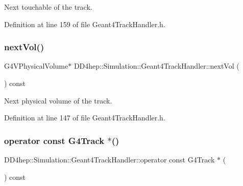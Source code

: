 Next touchable of the track. 



Definition at line 159 of file Geant4\+Track\+Handler.\+h.

\hypertarget{class_d_d4hep_1_1_simulation_1_1_geant4_track_handler_ad00d99a8dbf18835de9b4cc52a50061b}{}\label{class_d_d4hep_1_1_simulation_1_1_geant4_track_handler_ad00d99a8dbf18835de9b4cc52a50061b} 
\subsubsection{\texorpdfstring{next\+Vol()}{nextVol()}}
{\footnotesize\ttfamily G4\+V\+Physical\+Volume$\ast$ D\+D4hep\+::\+Simulation\+::\+Geant4\+Track\+Handler\+::next\+Vol (\begin{DoxyParamCaption}{ }\end{DoxyParamCaption}) const\hspace{0.3cm}{\ttfamily [inline]}}



Next physical volume of the track. 



Definition at line 147 of file Geant4\+Track\+Handler.\+h.

\hypertarget{class_d_d4hep_1_1_simulation_1_1_geant4_track_handler_a6a8487e74ce467e4792ec60cf9846f9e}{}\label{class_d_d4hep_1_1_simulation_1_1_geant4_track_handler_a6a8487e74ce467e4792ec60cf9846f9e} 
\subsubsection{\texorpdfstring{operator const G4\+Track $\ast$()}{operator const G4Track *()}}
{\footnotesize\ttfamily D\+D4hep\+::\+Simulation\+::\+Geant4\+Track\+Handler\+::operator const G4\+Track $\ast$ (\begin{DoxyParamCaption}{ }\end{DoxyParamCaption}) const\hspace{0.3cm}{\ttfamily [inline]}}



